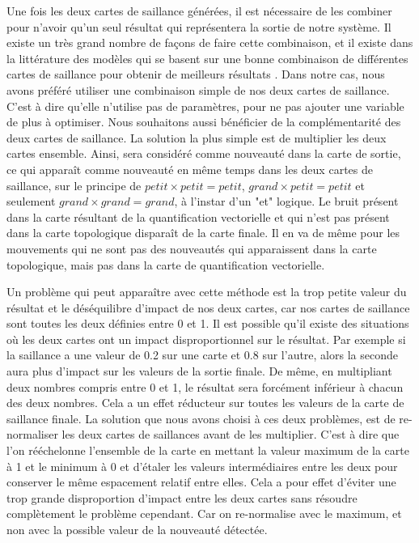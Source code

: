 	Une fois les deux cartes de saillance générées, il est nécessaire de les combiner pour n'avoir qu'un seul résultat qui représentera la sortie de notre système. Il existe un très grand nombre de façons de faire cette combinaison, et il existe dans la littérature des modèles qui se basent sur une bonne combinaison de différentes cartes de saillance pour obtenir de meilleurs résultats \cite{bianco2017combination}. Dans notre cas, nous avons préféré utiliser une combinaison simple de nos deux cartes de saillance. C'est à dire qu'elle n'utilise pas de paramètres, pour ne pas ajouter une variable de plus à optimiser. Nous souhaitons aussi bénéficier de la complémentarité des deux cartes de saillance. La solution la plus simple est de multiplier les deux cartes ensemble. Ainsi, sera considéré comme nouveauté dans la carte de sortie, ce qui apparaît comme nouveauté en même temps dans les deux cartes de saillance, sur le principe de $\textit{petit} \times \textit{petit} = \textit{petit}$, $\textit{grand} \times \textit{petit} = \textit{petit}$ et seulement $\textit{grand} \times \textit{grand} = \textit{grand}$, à l'instar d'un "et" logique. Le bruit présent dans la carte résultant de la quantification vectorielle et qui n'est pas présent dans la carte topologique disparaît de la carte finale. Il en va de même pour les mouvements qui ne sont pas des nouveautés qui apparaissent dans la carte topologique, mais pas dans la carte de quantification vectorielle.

	Un problème qui peut apparaître avec cette méthode est la trop petite valeur du résultat et le déséquilibre d'impact de nos deux cartes, car nos cartes de saillance sont toutes les deux définies entre 0 et 1. Il est possible qu'il existe des situations où les deux cartes ont un impact disproportionnel sur le résultat. Par exemple si la saillance a une valeur de 0.2 sur une carte et 0.8 sur l'autre, alors la seconde aura plus d'impact sur les valeurs de la sortie finale. De même, en multipliant deux nombres compris entre 0 et 1, le résultat sera forcément inférieur à chacun des deux nombres. Cela a un effet réducteur sur toutes les valeurs de la carte de saillance finale. La solution que nous avons choisi à ces deux problèmes, est de re-normaliser les deux cartes de saillances avant de les multiplier. C'est à dire que l'on rééchelonne l'ensemble de la carte en mettant la valeur maximum de la carte à 1 et le minimum à 0 et d'étaler les valeurs intermédiaires entre les deux pour conserver le même espacement relatif entre elles. Cela a pour effet d'éviter une trop grande disproportion d'impact entre les deux cartes sans résoudre complètement le problème cependant. Car on re-normalise avec le maximum, et non avec la possible valeur de la nouveauté détectée. 
	
